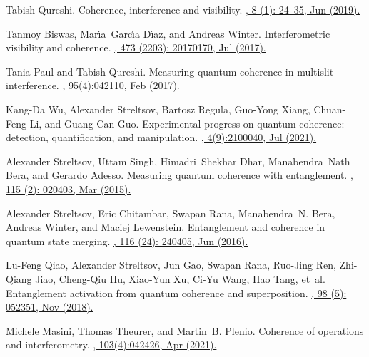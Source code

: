 \documentclass[letterpaper,onecolumn,12pt,accepted=2024-01-17]{article}
\begin{document}
\begin{thebibliography}{100}
Tabish Qureshi.
\newblock Coherence, interference and visibility.
\href{https://doi.org/10.12743/quanta.v8i1.87}{, 8 (1): 24--35, Jun (2019).}

Tanmoy Biswas, Mar{\'{\i}}a~Garc{\'{\i}}a D{\'{\i}}az, and Andreas Winter.
\newblock Interferometric visibility and coherence.
\href{https://doi.org/10.1098/rspa.2017.0170}{, 473 (2203): 20170170, Jul (2017).}

Tania Paul and Tabish Qureshi.
\newblock Measuring quantum coherence in multislit interference.
\href{https://doi.org/10.1103/PhysRevA.95.042110}{, 95(4):042110, Feb (2017).}

Kang-Da Wu, Alexander Streltsov, Bartosz Regula, Guo-Yong Xiang, Chuan-Feng Li,
  and Guang-Can Guo.
\newblock Experimental progress on quantum coherence: detection,
  quantification, and manipulation.
\href{https://doi.org/10.1002/qute.202100040}{, 4(9):2100040, Jul (2021).}

Alexander Streltsov, Uttam Singh, Himadri~Shekhar Dhar, Manabendra~Nath Bera,
  and Gerardo Adesso.
\newblock Measuring quantum coherence with entanglement.
\href{https://doi.org/10.1103/PhysRevLett.115.020403}{, 115 (2): 020403, Mar (2015).}

Alexander Streltsov, Eric Chitambar, Swapan Rana, Manabendra~N. Bera, Andreas
  Winter, and Maciej Lewenstein.
\newblock Entanglement and coherence in quantum state merging.
\href{https://doi.org/10.1103/PhysRevLett.116.240405}{, 116 (24): 240405, Jun (2016).}

Lu-Feng Qiao, Alexander Streltsov, Jun Gao, Swapan Rana, Ruo-Jing Ren,
  Zhi-Qiang Jiao, Cheng-Qiu Hu, Xiao-Yun Xu, Ci-Yu Wang, Hao Tang, et~al.
\newblock Entanglement activation from quantum coherence and superposition.
\href{https://doi.org/10.1103/PhysRevA.98.052351}{, 98 (5): 052351, Nov (2018).}

Michele Masini, Thomas Theurer, and Martin~B. Plenio.
\newblock Coherence of operations and interferometry.
\href{https://doi.org/10.1103/PhysRevA.103.042426}{, 103(4):042426, Apr (2021).}


\end{thebibliography}
\end{document}

